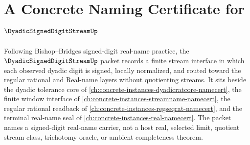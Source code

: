 \chapter{A Concrete Naming Certificate for $\DyadicSignedDigitStreamUp$}
\label{ch:concrete-instances-dyadic-signed-digit-stream-namecert}

Following Bishop--Bridges signed-digit real-name practice, the $\DyadicSignedDigitStreamUp$ packet records a finite stream interface in which each observed dyadic digit is signed, locally normalized, and routed toward the regular rational and Real-name layers without quotienting streams. It sits beside the dyadic tolerance core of \autoref{ch:concrete-instances-dyadicratcore-namecert}, the finite window interface of \autoref{ch:concrete-instances-streamname-namecert}, the regular rational readback of \autoref{ch:concrete-instances-regseqrat-namecert}, and the terminal real-name seal of \autoref{ch:concrete-instances-real-namecert}. The packet names a signed-digit real-name carrier, not a host real, selected limit, quotient stream class, trichotomy oracle, or ambient completeness theorem.


